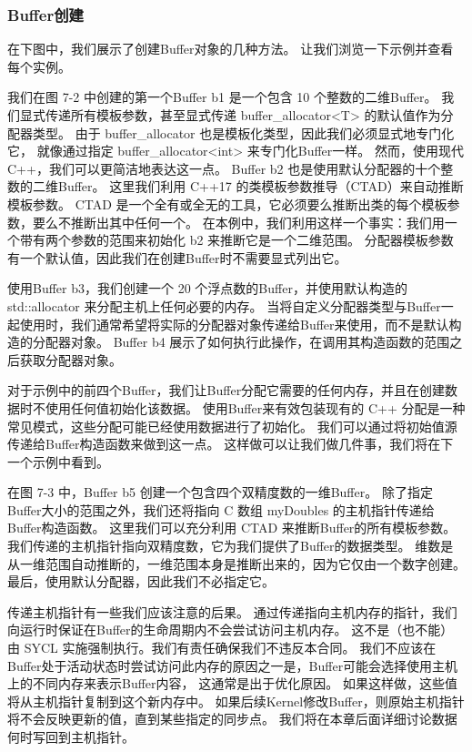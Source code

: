 \subsubsection{Buffer创建}
在下图中，我们展示了创建Buffer对象的几种方法。 让我们浏览一下示例并查看每个实例。

我们在图 7-2 中创建的第一个Buffer b1 是一个包含 10 个整数的二维Buffer。 
我们显式传递所有模板参数，甚至显式传递 buffer\_allocator<T> 的默认值作为分配器类型。 
由于 buffer\_allocator 也是模板化类型，因此我们必须显式地专门化它，
就像通过指定 buffer\_allocator<int> 来专门化Buffer一样。 然而，使用现代 C++，我们可以更简洁地表达这一点。 
Buffer b2 也是使用默认分配器的十个整数的二维Buffer。 
这里我们利用 C++17 的类模板参数推导（CTAD）来自动推断模板参数。 
CTAD 是一个全有或全无的工具，它必须要么推断出类的每个模板参数，要么不推断出其中任何一个。 
在本例中，我们利用这样一个事实：我们用一个带有两个参数的范围来初始化 b2 来推断它是一个二维范围。 
分配器模板参数有一个默认值，因此我们在创建Buffer时不需要显式列出它。

使用Buffer b3，我们创建一个 20 个浮点数的Buffer，并使用默认构造的 std::allocator 来分配主机上任何必要的内存。 
当将自定义分配器类型与Buffer一起使用时，我们通常希望将实际的分配器对象传递给Buffer来使用，而不是默认构造的分配器对象。 
Buffer b4 展示了如何执行此操作，在调用其构造函数的范围之后获取分配器对象。

对于示例中的前四个Buffer，我们让Buffer分配它需要的任何内存，并且在创建数据时不使用任何值初始化该数据。 
使用Buffer来有效包装现有的 C++ 分配是一种常见模式，这些分配可能已经使用数据进行了初始化。 
我们可以通过将初始值源传递给Buffer构造函数来做到这一点。 这样做可以让我们做几件事，我们将在下一个示例中看到。

在图 7-3 中，Buffer b5 创建一个包含四个双精度数的一维Buffer。 
除了指定Buffer大小的范围之外，我们还将指向 C 数组 myDoubles 的主机指针传递给Buffer构造函数。 
这里我们可以充分利用 CTAD 来推断Buffer的所有模板参数。 
我们传递的主机指针指向双精度数，它为我们提供了Buffer的数据类型。 
维数是从一维范围自动推断的，一维范围本身是推断出来的，因为它仅由一个数字创建。 
最后，使用默认分配器，因此我们不必指定它。

传递主机指针有一些我们应该注意的后果。 
通过传递指向主机内存的指针，我们向运行时保证在Buffer的生命周期内不会尝试访问主机内存。 
这不是（也不能）由 SYCL 实施强制执行。我们有责任确保我们不违反本合同。 
我们不应该在Buffer处于活动状态时尝试访问此内存的原因之一是，Buffer可能会选择使用主机上的不同内存来表示Buffer内容，
这通常是出于优化原因。 如果这样做，这些值将从主机指针复制到这个新内存中。 
如果后续Kernel修改Buffer，则原始主机指针将不会反映更新的值，直到某些指定的同步点。 
我们将在本章后面详细讨论数据何时写回到主机指针。

